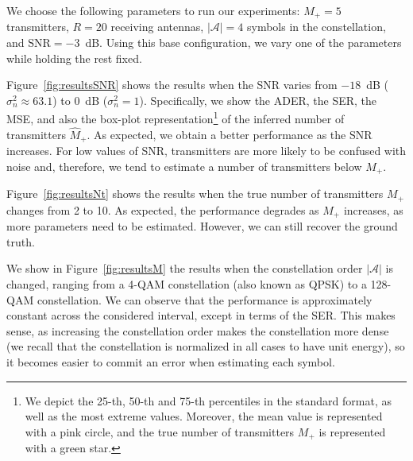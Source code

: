 \documentclass[a4paper]{article}
\def\Acal{\mathcal{A}}
\begin{document}
We choose the following parameters to run our experiments: $M_+=5$ transmitters, $R=20$ receiving antennas, $|\Acal|=4$ symbols in the constellation, and $\textrm{SNR}=-3$~dB. Using this base configuration, we vary one of the parameters while holding the rest fixed.

Figure~\ref{fig:resultsSNR} shows the results when the SNR varies from $-18$~dB ($\sigma_n^2\approx 63.1$) to $0$~dB ($\sigma_n^2=1$). Specifically, we show the ADER, the SER, the MSE, and also the box-plot representation\footnote{We depict the 25-th, 50-th and 75-th percentiles in the standard format, as well as the most extreme values. Moreover, the mean value is represented with a pink circle, and the true number of transmitters $M_+$ is represented with a green star.} of the inferred number of transmitters $\hat{M}_+$. As expected, we obtain a better performance as the SNR increases. For low values of SNR, transmitters are more likely to be confused with noise and, therefore, we tend to estimate a number of transmitters below $M_+$.

Figure~\ref{fig:resultsNt} shows the results when the true number of transmitters $M_+$ changes from 2 to 10. As expected, the performance degrades as $M_+$ increases, as more parameters need to be estimated. However, we can still recover the ground truth.

We show in Figure~\ref{fig:resultsM} the results when the constellation order $|\Acal|$ is changed, ranging from a 4-QAM constellation (also known as QPSK) to a 128-QAM constellation. We can observe that the performance is approximately constant across the considered interval, except in terms of the SER. This makes sense, as increasing the constellation order makes the constellation more dense (we recall that the constellation is normalized in all cases to have unit energy), so it becomes easier to commit an error when estimating each symbol.
\end{document}
